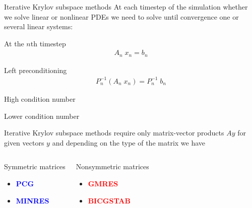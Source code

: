 \documentclass[handout]{beamer}
{
\usepackage{fullpage}
\usepackage{hyperref}
\usepackage{amssymb} 
}
\newcommand{\red}[1]{\textcolor{red}{#1}}
\newcommand{\blue}[1]{\textcolor{blue}{#1}}
\begin{document}
\begin{frame}{Iterative Krylov subspace methods}
 At each timestep of the simulation whether we solve linear or nonlinear 
 PDEs we need to solve until convergence one or several linear systems:
\begin{center}
 \begin{minipage}{0.45\textwidth}
 \begin{block}{At the $n$th timestep}
\begin{align*}
 A_n \; x_n = b_n
\end{align*}
\end{block}
\end{minipage}
\hfill
\begin{minipage}{0.45\textwidth}
\begin{block}{Left preconditioning}
\begin{align*}
P_n^{-1} (A_n \; x_n) = P_n^{-1} \; b_n
\end{align*}
\end{block}
\end{minipage}

\medskip

 \begin{minipage}{0.45\textwidth}
\begin{block}{}
High condition number
\end{block}
\end{minipage}
\hfill
 \begin{minipage}{0.45\textwidth}
\begin{block}{}
Lower condition number
\end{block}
\end{minipage}

\medskip
\pause
Iterative Krylov subspace methods require only matrix-vector 
products $Ay$ for given vectors $y$ and depending on the type
of the matrix we have

\begin{columns}[t]
\begin{block}{Symmetric matrices}
\begin{itemize}
\item \blue{\bf{PCG}}
\item \blue{\bf{MINRES}}
\end{itemize}
\end{block}

\begin{block}{Nonsymmetric matrices}
\begin{itemize}
\item \red{\bf{GMRES}}
\item \red{\bf{BICGSTAB}}
\end{itemize}
\end{block}
\end{columns}


\end{center}
\end{frame}
\end{document}
